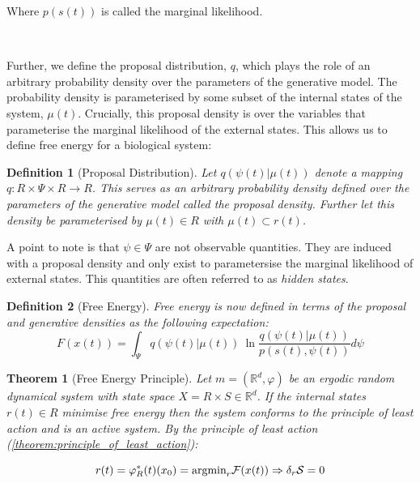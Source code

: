 \documentclass{article}
\newcommand{\refp}[1]{(\ref{#1})}
\newcommand{\R}{\mathbb{R}}
\newtheorem{theorem}{Theorem}
\newtheorem{definition}{Definition}
\begin{document}
Where $p(s(t))$ is called the marginal likelihood. 

\

Further, we define the proposal distribution, $q$, which plays the role of an arbitrary probability density over the parameters of the generative model. The probability density is parameterised by some subset of the internal states of the system, $\mu(t)$. Crucially, this proposal density is over the variables that parameterise the marginal likelihood of the external states. This allows us to define free energy for a biological system:

\begin{definition}[Proposal Distribution]\label{def:proposal_distribution}
Let $q(\psi(t) | \mu(t))$ denote a mapping $q: R \times \Psi \times R \to R$. This serves as an arbitrary probability density defined over the parameters of the generative model called the proposal density. Further let this density be parameterised by $\mu(t) \in R$ with $\mu(t) \subset r(t)$. 
\end{definition}

A point to note is that $\psi \in \Psi$ are not observable quantities. They are induced with a proposal density and only exist to parametersise the marginal likelihood of external states. This quantities are often referred to as \textit{hidden states}.

\begin{definition}[Free Energy]\label{eq:free_energy}
Free energy is now defined in terms of the proposal and generative  densities as the following expectation:
$$
F(x(t)) = \int_\Psi q(\psi(t) | \mu(t))\ \ln\frac{q(\psi(t) | \mu(t))}{p(s(t), \psi(t))} d\psi
$$
\end{definition}

\begin{theorem}[Free Energy Principle]\label{theorem:free_energy_principle}
Let $ m = (\R^d, \varphi)$ be an ergodic random dynamical system with state space $X = R \times S \in \R^d$. If the internal states $r(t) \in R$ minimise free energy then the system conforms to the principle of least action and is an active system. By the principle of least action \refp{theorem:principle_of_least_action}:

$$
r(t) = \varphi_R^*(t)(x_0) = \text{argmin}_{r} \mathcal{F}(x(t)) \Rightarrow \delta_r \mathcal{S} = 0 \\
$$
\end{theorem}
\end{document}
